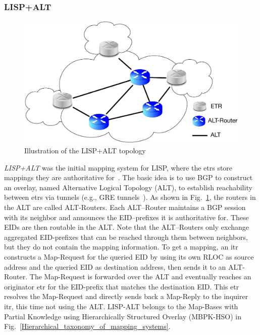 \subsubsection{LISP+ALT}
\label{sec:lispalt}
\begin{figure}[!t]
	\centering
	\includegraphics[width=\textwidth]{Chapter2/Pics/LISP_ALT.eps}
	\caption{Illustration of the LISP+ALT topology}
	\label{LISP_ALT}
\end{figure}
\emph{LISP+ALT} was the initial mapping system for LISP, where the \acrshort{etr}s store mappings they are authoritative for~\cite{lispCCR}. The basic idea is to use BGP to construct an overlay, named Alternative Logical Topology (ALT), to establish reachability between \acrshort{etr}s via tunnels (e.g., GRE tunnels~\cite{farinacci2000rfc}). As shown in Fig.~\ref{LISP_ALT}, the routers in the ALT are called ALT-Routers. Each ALT–Router maintains a BGP session with its neighbor and announces the EID–prefixes it is authoritative for. These EIDs are then routable in the ALT. Note that the ALT–Routers only exchange aggregated EID-prefixes that can be reached through them between neighbors, but they do not contain the mapping information. To get a mapping, an \acrshort{itr} constructs a Map-Request for the queried EID by using its own RLOC as source address and the queried EID as destination address, then sends it to an ALT-Router. The Map-Request is forwarded over the ALT and eventually reaches an originator \acrshort{etr} for the EID-prefix that matches the destination EID. This \acrshort{etr} resolves the Map-Request and directly sends back a Map-Reply to the inquirer \acrshort{itr}, this time not using the ALT. LISP-ALT belongs to the Map-Bases with Partial Knowledge using Hierarchically Structured Overlay (MBPK-HSO) in Fig.~\ref{Hierarchical_taxonomy_of_mapping_systems}.



